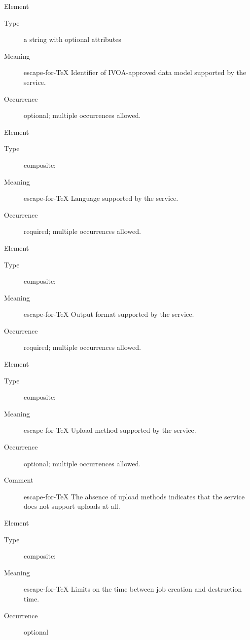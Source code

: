 \documentclass{ivoa}
\begin{document}
\begingroup\small\begin{bigdescription}\item[Element \xmlel{dataModel}]
\begin{description}
\item[Type] a string with optional attributes
\item[Meaning] escape-for-TeX{{{
              Identifier of IVOA-approved data model supported by the 
              service.
              }}}
\item[Occurrence] optional; multiple occurrences allowed.

\end{description}
\item[Element \xmlel{language}]
\begin{description}
\item[Type] composite: 
\item[Meaning] escape-for-TeX{{{
              Language supported by the service.
              }}}
\item[Occurrence] required; multiple occurrences allowed.

\end{description}
\item[Element \xmlel{outputFormat}]
\begin{description}
\item[Type] composite: 
\item[Meaning] escape-for-TeX{{{
                Output format supported by the service.
              }}}
\item[Occurrence] required; multiple occurrences allowed.

\end{description}
\item[Element \xmlel{uploadMethod}]
\begin{description}
\item[Type] composite: 
\item[Meaning] escape-for-TeX{{{
                Upload method supported by the service.
              }}}
\item[Occurrence] optional; multiple occurrences allowed.
\item[Comment] escape-for-TeX{{{
                The absence of upload methods indicates
                that the service does not support uploads
                at all.
              }}}

\end{description}
\item[Element \xmlel{retentionPeriod}]
\begin{description}
\item[Type] composite: 
\item[Meaning] escape-for-TeX{{{
              Limits on the time between job creation and
              destruction time.
              }}}
\item[Occurrence] optional


\end{description}
\end{bigdescription}
\end{document}
